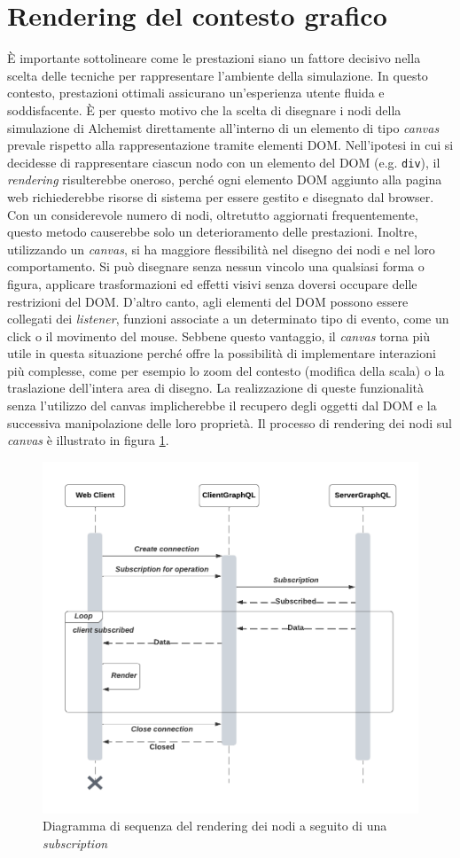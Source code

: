 \section{Rendering del contesto grafico}\label{section:rendering-analysis}
È importante sottolineare come le prestazioni siano un fattore decisivo nella scelta delle tecniche per rappresentare l'ambiente della simulazione.
In questo contesto, prestazioni ottimali assicurano un'esperienza utente fluida e soddisfacente. È per questo motivo che la scelta di disegnare i nodi della simulazione di Alchemist direttamente all'interno di un elemento di tipo \textit{canvas } prevale rispetto alla rappresentazione tramite elementi \ac{DOM}. Nell'ipotesi in cui si decidesse di rappresentare ciascun nodo con un elemento del DOM (e.g. \texttt{div}), il \textit{rendering} risulterebbe oneroso, perché ogni elemento \ac{DOM} aggiunto alla pagina web richiederebbe risorse di sistema per essere gestito e disegnato dal browser. Con un considerevole numero di nodi, oltretutto aggiornati frequentemente, questo metodo causerebbe solo un deterioramento delle prestazioni. Inoltre, utilizzando un \textit{canvas}, si ha maggiore flessibilità nel disegno dei nodi e nel loro comportamento. Si può disegnare senza nessun vincolo una qualsiasi forma o figura, applicare trasformazioni ed effetti visivi senza doversi occupare delle restrizioni del \ac{DOM}. D'altro canto, agli elementi del \ac{DOM} possono essere collegati dei \textit{listener}, funzioni associate a un determinato tipo di evento, come un click o il movimento del mouse. Sebbene questo vantaggio, il \textit{canvas} torna più utile in questa situazione perché offre la possibilità di implementare interazioni più complesse, come per esempio lo zoom del contesto (modifica della scala) o la traslazione dell'intera area di disegno. La realizzazione di queste funzionalità senza l'utilizzo del canvas implicherebbe il recupero degli oggetti dal \ac{DOM} e la successiva manipolazione delle loro proprietà.
Il processo di rendering dei nodi sul \textit{canvas} è illustrato in figura \cref{fig:rendering-graphics}.
\begin{figure}
	\centering
	\includegraphics[width=.63\linewidth]{imgs/Rendering_Diagramma_Sequenza.pdf}
	\caption{Diagramma di sequenza del rendering dei nodi a seguito di una \textit{subscription}}
	\label{fig:rendering-graphics}
\end{figure}
